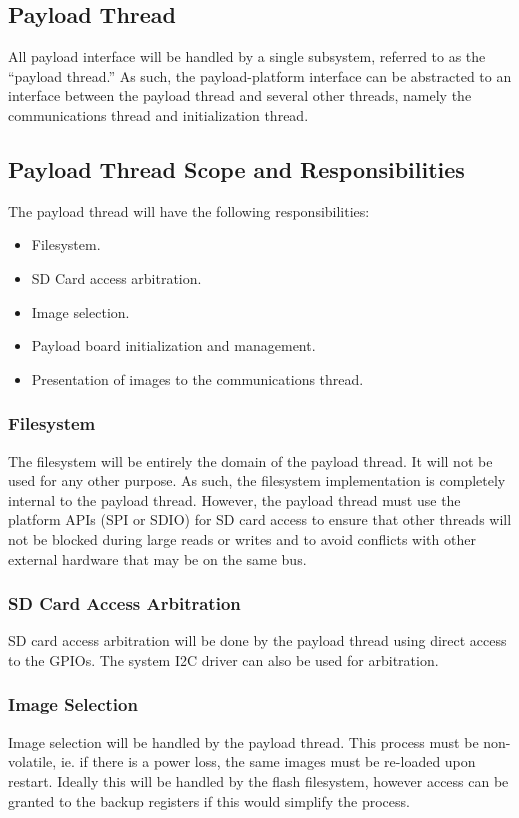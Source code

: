 \documentclass{article}
\begin{document}
\subsection{Payload Thread}
All payload interface will be handled by a single subsystem, referred to as the
``payload thread.'' As such, the payload-platform interface can be abstracted
to an interface between the payload thread and several other threads, namely
the communications thread and initialization thread.

\subsection{Payload Thread Scope and Responsibilities}
The payload thread will have the following responsibilities:
\begin{itemize}
    \item Filesystem.
    \item SD Card access arbitration.
    \item Image selection.
    \item Payload board initialization and management.
    \item Presentation of images to the communications thread.
\end{itemize}

\subsubsection{Filesystem}
The filesystem will be entirely the domain of the payload thread. It will not be
used for any other purpose. As such, the filesystem implementation is completely
internal to the payload thread. However, the payload thread must use the
platform APIs (SPI or SDIO) for SD card access to ensure that other threads will not be blocked
during large reads or writes and to avoid conflicts with other external hardware
that may be on the same bus.

\subsubsection{SD Card Access Arbitration}
SD card access arbitration will be done by the payload thread using direct access
to the GPIOs. The system I2C driver can also be used for arbitration.

\subsubsection{Image Selection}
Image selection will be handled by the payload thread. This process must be
non-volatile, ie. if there is a power loss, the same images must be re-loaded
upon restart. Ideally this will be handled by the flash filesystem, however
access can be granted to the backup registers if this would simplify the
process.
\end{document}
